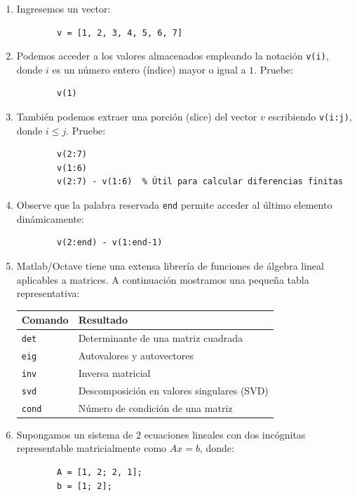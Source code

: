 \begin{enumerate}
	
	\item Ingresemos un vector:
	\begin{verbatim}
		v = [1, 2, 3, 4, 5, 6, 7]
	\end{verbatim}
	
	\item Podemos acceder a los valores almacenados empleando la notación \verb-v(i)-, donde $i$ es un número entero (índice) mayor o igual a $1$. Pruebe:
	\begin{verbatim}
		v(1)
	\end{verbatim}
	
	\item También podemos extraer una porción (slice) del vector $v$ escribiendo \verb-v(i:j)-, donde $i \leq j$. Pruebe:
	\begin{verbatim}
		v(2:7)
		v(1:6)
		v(2:7) - v(1:6)  % Útil para calcular diferencias finitas
	\end{verbatim}
	
	\item Observe que la palabra reservada \texttt{end} permite acceder al último elemento dinámicamente:
	\begin{verbatim}
		v(2:end) - v(1:end-1)
	\end{verbatim}
	
	\item Matlab/Octave tiene una extensa librería de funciones de álgebra lineal aplicables a matrices. A continuación mostramos una pequeña tabla representativa:
	\begin{center}
		\begin{tabular}{ll}
			\textbf{Comando} & \textbf{Resultado} \\ \hline
			\texttt{det} & Determinante de una matriz cuadrada \\
			\texttt{eig} & Autovalores y autovectores \\
			\texttt{inv} & Inversa matricial \\
			\texttt{svd} & Descomposición en valores singulares (SVD) \\
			\texttt{cond} & Número de condición de una matriz \\
		\end{tabular}
	\end{center}
	
	\item Supongamos un sistema de 2 ecuaciones lineales con dos incógnitas representable matricialmente como $Ax=b$, donde:
	\begin{verbatim}
		A = [1, 2; 2, 1];
		b = [1; 2];
	\end{verbatim}
	

\end{enumerate}
